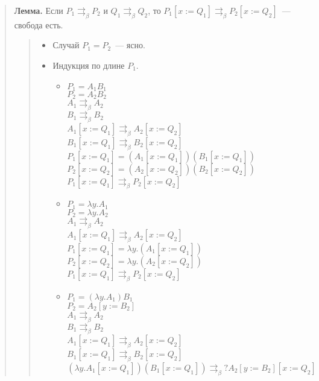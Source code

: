 \documentclass[12pt]{article}
\begin{document}
	\begin{quote}
		\textbf{Лемма.} Если $P_1 \rightrightarrows_{\beta} P_2$ и $Q_1 \rightrightarrows_{\beta} Q_2$, то $P_1 [x := Q_1] \rightrightarrows_{\beta} P_2 [x := Q_2]$~--- свобода есть.
		\begin{quote}
			\begin{itemize}
				\item Случай $P_1 = P_2$~--- ясно.
				\item Индукция по длине $P_1$.
				\begin{itemize}
					\item $P_1 = A_1 B_1$ \\
					$P_2 = A_2 B_2$ \\
					$A_1 \rightrightarrows_{\beta} A_2$ \\
					$B_1 \rightrightarrows_{\beta} B_2$ \\
					$A_1 [x := Q_1] \rightrightarrows_{\beta} A_2 [x := Q_2]$ \\
					$B_1 [x := Q_1] \rightrightarrows_{\beta} B_2 [x := Q_2]$ \\
					$P_1 [x := Q_1] = (A_1[x := Q_1])(B_1 [x:= Q_1])$ \\
					$P_2 [x := Q_2] = (A_2[x := Q_2])(B_2 [x:= Q_2])$ \\
					$P_1 [x := Q_1] \rightrightarrows_{\beta} P_2 [x := Q_2]$
					\item $P_1 = \lambda y. A_1$ \\
					$P_2 = \lambda y. A_2$ \\
					$A_1 \rightrightarrows_{\beta} A_2$ \\
					$A_1 [x := Q_1] \rightrightarrows_{\beta} A_2 [x := Q_2]$ \\
					$P_1 [x := Q_1] = \lambda y. (A_1 [x := Q_1])$ \\
					$P_2 [x := Q_2] = \lambda y. (A_2 [x := Q_2])$ \\
					$P_1 [x := Q_1] \rightrightarrows_{\beta} P_2 [x := Q_2]$
					\item $P_1 = (\lambda y. A_1) B_1$ \\
					$P_2 = A_2 [y := B_2]$ \\
					$A_1 \rightrightarrows_{\beta} A_2$ \\
					$B_1 \rightrightarrows_{\beta} B_2$ \\
					$A_1 [x := Q_1] \rightrightarrows_{\beta} A_2 [x := Q_2]$ \\
					$B_1 [x := Q_1] \rightrightarrows_{\beta} B_2 [x := Q_2]$ \\
					$(\lambda y. A_1 [x := Q_1])(B_1 [x := Q_1]) \rightrightarrows_{\beta} ? A_2 [y := B_2][x := Q_2]$ \\

\end{itemize}
\end{itemize}
\end{quote}
\end{quote}
\end{document}
